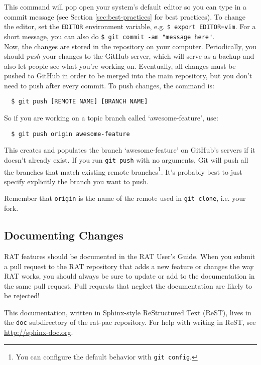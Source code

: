 \documentclass{article}
\begin{document}
This command will pop open your system's default editor so you can type in a
commit message (see Section \ref{sec:best-practices} for best practices).
To change the editor, set the {\tt EDITOR} environment variable, e.g.
{\tt \$ export EDITOR=vim}. For a short message, you can also do
{\tt \$ git commit -am "message here"}.\\

Now, the changes are stored in the repository on your computer. Periodically,
you should {\it push} your changes to the GitHub server, which will serve as a
backup and also let people see what you're working on. Eventually, all changes
must be pushed to GitHub in order to be merged into the main repository, but
you don't need to push after every commit. To push changes, the command is:

\begin{verbatim}
  $ git push [REMOTE NAME] [BRANCH NAME]
\end{verbatim}
So if you are working on a topic branch called `awesome-feature', use:

\begin{verbatim}
  $ git push origin awesome-feature
\end{verbatim}
This creates and populates the branch `awesome-feature' on GitHub's servers
if it doesn't already exist. If you run {\tt git push} with no arguments, Git
will push all the branches that match existing remote branches\footnote{You
can configure the default behavior with {\tt git config}.}. It's probably
best to just specify explicitly the branch you want to push.

Remember that {\tt origin} is the name of the remote used in {\tt git clone},
i.e. your fork.

\subsection{Documenting Changes}
RAT features should be documented in the RAT User's Guide.
When you submit a pull request to the RAT repository that adds a new feature
or changes the way RAT works, you should always be sure to update or add to
the documentation in the same pull request. Pull requests that neglect the
documentation are likely to be rejected!

This documentation, written in Sphinx-style ReStructured Text (ReST), lives in
the {\tt doc} subdirectory of the rat-pac repository. For help with writing in
ReST, see \href{http://sphix-doc.org}{http://sphinx-doc.org}.
\end{document}
